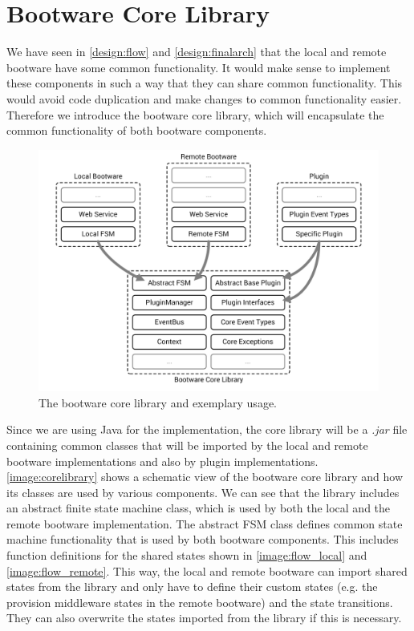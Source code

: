 \section{Bootware Core Library}

We have seen in \autoref{design:flow} and \autoref{design:finalarch} that the local and remote bootware have some common functionality.
It would make sense to implement these components in such a way that they can share common functionality.
This would avoid code duplication and make changes to common functionality easier.
Therefore we introduce the bootware core library, which will encapsulate the common functionality of both bootware components.

\begin{figure}[!htbp]
	\centering
	\includegraphics[resolution=600]{implementation/assets/core_library}
	\caption{The bootware core library and exemplary usage.}
	\label{image:corelibrary}
\end{figure}

Since we are using Java for the implementation, the core library will be a \textit{.jar} file containing common classes that will be imported by the local and remote bootware implementations and also by plugin implementations.
\autoref{image:corelibrary} shows a schematic view of the bootware core library and how its classes are used by various components.
We can see that the library includes an abstract finite state machine class, which is used by both the local and the remote bootware implementation.
The abstract FSM class defines common state machine functionality that is used by both bootware components.
This includes function definitions for the shared states shown in \autoref{image:flow_local} and \autoref{image:flow_remote}.
This way, the local and remote bootware can import shared states from the library and only have to define their custom states (e.g. the provision middleware states in the remote bootware) and the state transitions.
They can also overwrite the states imported from the library if this is necessary.

